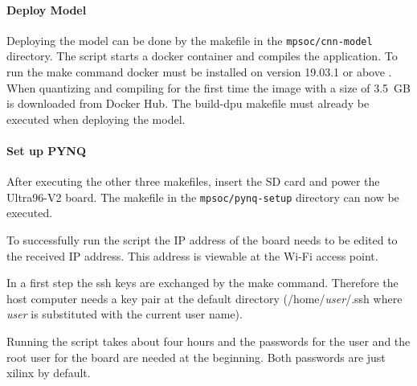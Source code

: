 \paragraph{Deploy Model}
Deploying the model can be done by the makefile in the \texttt{mpsoc/cnn-model} directory.
The script starts a docker container and compiles the application.
To run the make command docker must be installed on version 19.03.1 or above \cite{vitis_ai_user_guide}.
When quantizing and compiling for the first time the image with a size of \SI{3.5}{GB} is downloaded from Docker Hub.
The build-dpu makefile must already be executed when deploying the model.

\paragraph{Set up PYNQ}
After executing the other three makefiles, insert the SD card and power the Ultra96-V2 board.
The makefile in the \texttt{mpsoc/pynq-setup} directory can now be executed.

To successfully run the script the IP address of the board needs to be edited to the received IP address.
This address is viewable at the Wi-Fi access point.

In a first step the \acrshort{ssh} keys are exchanged by the make command.
Therefore the host computer needs a key pair at the default directory (/home/\textit{user}/.ssh where \textit{user} is substituted with the current user name).

Running the script takes about four hours and the passwords for the user and the root user for the board are needed at the beginning.
Both passwords are just xilinx by default.
